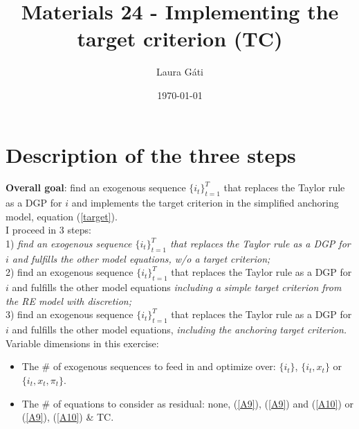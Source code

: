 \documentclass[11pt]{article}
\renewcommand{\[}{\begin{equation}}
\renewcommand{\]}{\end{equation}}
\begin{document}
\linespread{1.0}

\title{Materials 24 - Implementing the target criterion (TC)}
\author{Laura G\'ati} 
\date{\today}
\maketitle


\tableofcontents


\section{Description of the three steps}
\textbf{Overall goal}: find an exogenous sequence $\{i_t\}_{t=1}^{T}$ that replaces the Taylor rule as a DGP for $i$ and implements the target criterion in the simplified anchoring model, equation (\ref{target}).\\
I proceed in 3 steps: \\
1) \emph{find an exogenous sequence $\{i_t\}_{t=1}^{T}$ that replaces the Taylor rule as a DGP for $i$ and fulfills the other model equations, w/o a target criterion;} \\
2) find an exogenous sequence $\{i_t\}_{t=1}^{T}$ that replaces the Taylor rule as a DGP for $i$ and fulfills the other model equations \emph{including a simple target criterion from the RE model with discretion;} \\
3) find an exogenous sequence $\{i_t\}_{t=1}^{T}$ that replaces the Taylor rule as a DGP for $i$ and fulfills the other model equations, \emph{including the anchoring target criterion.} \\
Variable dimensions in this exercise:
\begin{itemize}
\item The \# of exogenous sequences to feed in and optimize over: $\{i_t\}$, $\{i_t, x_t\}$ or $\{i_t, x_t, \pi_t\}$.
\item The \# of equations to consider as residual: none, (\ref{A9}), (\ref{A9}) and (\ref{A10}) or (\ref{A9}), (\ref{A10}) \& TC.
\end{itemize}
\end{document}
